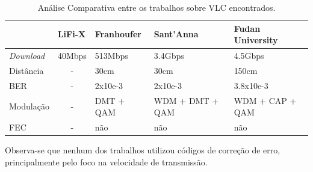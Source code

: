 	\begin{table}[ht]
		\centering
		\caption{Análise Comparativa entre os trabalhos sobre VLC encontrados.}
		\label{table:comp-revbib}
		\begin{tabular}{lclll}
			\hline
			& \multicolumn{1}{l}{LiFi-X} & Franhoufer & Sant’Anna       & Fudan University \\ \hline
			\textit{Download}  & \multicolumn{1}{l}{40Mbps} & 513Mbps    & 3.4Gbps         & 4.5Gbps          \\
			Distância & -      & 30cm       & 30cm            & 150cm            \\
			BER       & -      & 2x10e-3    & 2x10e-3         & 3.8x10e-3        \\
			Modulação & -      & DMT + QAM  & WDM + DMT + QAM & WDM + CAP + QAM  \\
			FEC       & -      & não        & não             & não            	 \\ \hline
		\end{tabular}
	\end{table}

	Observa-se que nenhum dos trabalhos utilizou códigos de correção de erro, principalmente pelo foco na velocidade de transmissão.